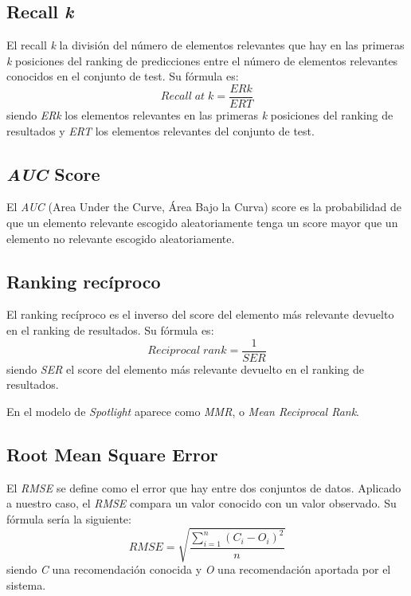 \subsection{Recall \textit{k}}\label{recall-k}
El recall \textit{k} \cite{recall_at_k} la división del número de elementos relevantes que hay en las primeras \textit{k} posiciones del ranking de predicciones entre el número de elementos relevantes conocidos en el conjunto de test. Su fórmula es:
\begin{equation}
Recall\;at\;k = \frac{ERk}{ERT}
\end{equation}
siendo \textit{ERk} los elementos relevantes en las primeras \textit{k} posiciones del ranking de resultados y \textit{ERT} los elementos relevantes del conjunto de test.

\subsection{\textit{AUC} Score}\label{auc-score}
El \textit{AUC} (Area Under the Curve, Área Bajo la Curva) score \cite{auc_score} es la probabilidad de que un elemento relevante escogido aleatoriamente tenga un score mayor que un elemento no relevante escogido aleatoriamente.

\subsection{Ranking recíproco}\label{ranking-reciproco}
El ranking recíproco \cite{reciprocal_rank} es el inverso del score del elemento más relevante devuelto en el ranking de resultados. Su fórmula es:
\begin{equation}
Reciprocal\;rank = \frac{1}{SER}
\end{equation}
siendo \textit{SER} el score del elemento más relevante devuelto en el ranking de resultados.

En el modelo de \textit{Spotlight} aparece como \textit{MMR}, o \textit{Mean Reciprocal Rank}.

\subsection{Root Mean Square Error}\label{rmse}
El \textit{RMSE} se define como el error que hay entre dos conjuntos de datos. Aplicado a nuestro caso, el \textit{RMSE} compara un valor conocido con un valor observado. Su fórmula sería la siguiente:
\begin{equation}
RMSE = \sqrt{\frac{\sum_{i=1}^n(C_{i} - O_{i})^{2}}{n}}
\end{equation}
siendo \textit{C} una recomendación conocida y \textit{O} una recomendación aportada por el sistema.

